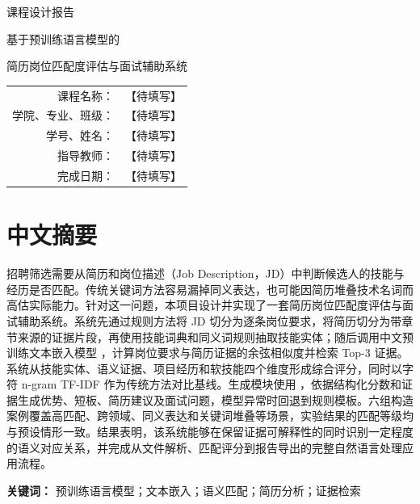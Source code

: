 \documentclass[UTF8,zihao=-4,a4paper,oneside]{ctexrep}
\renewcommand{\arraystretch}{1.35}
\newcommand{\coursename}{【待填写】}
\newcommand{\collegeclass}{【待填写】}
\newcommand{\studentinfo}{【待填写】}
\newcommand{\advisorname}{【待填写】}
\newcommand{\finishdate}{【待填写】}
\begin{document}
\begin{titlepage}
  \centering
  \vspace*{1.6cm}
  {\heiti{} 课程设计报告\par}
  \vspace{2.2cm}
  {\heiti{} 基于预训练语言模型的\par}
  \vspace{0.35cm}
  {\heiti{} 简历岗位匹配度评估与面试辅助系统\par}
  \vfill
  \renewcommand{\arraystretch}{1.7}
  \begin{tabular}{>{\heiti}r p{8.5cm}}
    课程名称： & \coursename \\
    学院、专业、班级： & \collegeclass \\
    学号、姓名： & \studentinfo \\
    指导教师： & \advisorname \\
    完成日期： & \finishdate \\
  \end{tabular}
  \vfill
\end{titlepage}



\chapter*{中文摘要}


招聘筛选需要从简历和岗位描述（Job Description，JD）中判断候选人的技能与经历是否匹配。传统关键词方法容易漏掉同义表达，也可能因简历堆叠技术名词而高估实际能力。针对这一问题，本项目设计并实现了一套简历岗位匹配度评估与面试辅助系统。系统先通过规则方法将 JD 切分为逐条岗位要求，将简历切分为带章节来源的证据片段，再使用技能词典和同义词规则抽取技能实体；随后调用中文预训练文本嵌入模型 \texttt{}，计算岗位要求与简历证据的余弦相似度并检索 Top-3 证据。系统从技能实体、语义证据、项目经历和软技能四个维度形成综合评分，同时以字符 n-gram TF-IDF 作为传统方法对比基线。生成模块使用 \texttt{}，依据结构化分数和证据生成优势、短板、简历建议及面试问题，模型异常时回退到规则模板。六组构造案例覆盖高匹配、跨领域、同义表达和关键词堆叠等场景，实验结果的匹配等级均与预设情形一致。结果表明，该系统能够在保留证据可解释性的同时识别一定程度的语义对应关系，并完成从文件解析、匹配评分到报告导出的完整自然语言处理应用流程。


\textbf{关键词：} 预训练语言模型；文本嵌入；语义匹配；简历分析；证据检索
\end{document}
